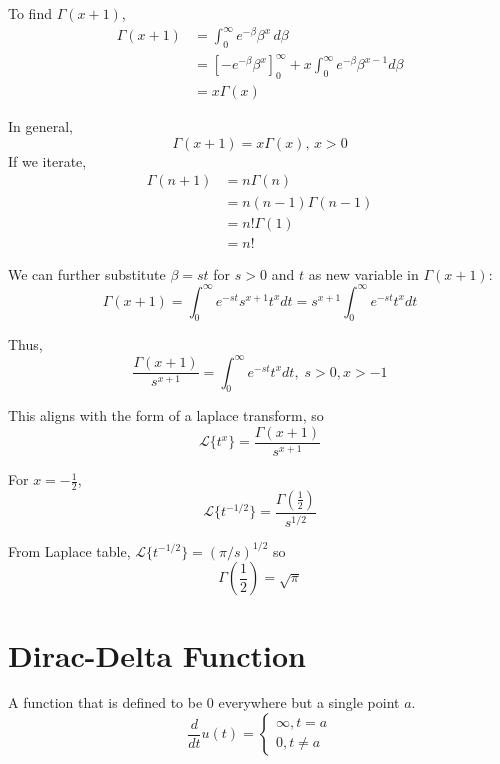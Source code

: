 To find $\Gamma(x+1)$,
\begin{align*}
    \Gamma(x+1)&=\int_0^\infty e^{-\beta}\beta^x\,d\beta\\
    &=\left[-e^{-\beta}\beta^x\right]_0^\infty + x\int_0^\infty e^{-\beta}\beta^{x-1}d\beta\\
    &=x\Gamma(x)
\end{align*}

In general,
\begin{equation}
    \Gamma(x+1)=x\Gamma(x),\,x>0
\end{equation}
If we iterate,
\begin{align*}
    \Gamma(n+1)&=n\Gamma(n)\\
    &=n(n-1)\Gamma(n-1)\\
    &=n!\Gamma(1)\\
    &=n!
\end{align*}

We can further substitute $\beta=st$ for $s>0$ and $t$ as new variable in $\Gamma(x+1)$:
\begin{equation*}
    \Gamma(x+1)=\int_0^\infty e^{-st}s^{x+1}t^xdt=s^{x+1}\int_0^\infty e^{-st}t^xdt
\end{equation*}

Thus,
\begin{equation}
    \frac{\Gamma(x+1)}{s^{x+1}}=\int_0^\infty e^{-st}t^xdt,\;s>0,x>-1
\end{equation}

This aligns with the form of a laplace transform, so
\begin{equation}
    \mathcal{L}\{t^x\}=\frac{\Gamma(x+1)}{s^{x+1}}
\end{equation}

For $x=-\frac{1}{2}$,
\begin{equation*}
    \mathcal{L}\{t^{-1/2}\}=\frac{\Gamma(\frac{1}{2})}{s^{1/2}}
\end{equation*}

From Laplace table, $\mathcal{L}\{t^{-1/2}\}=(\pi/s)^{1/2}$ so
$$ \Gamma\left(\frac{1}{2}\right)=\sqrt{\pi} $$

\section{Dirac-Delta Function}

A function that is defined to be 0 everywhere but a single point $a$.
\begin{equation*}
    \frac{d}{dt}u(t)=\begin{cases}
        \infty,t=a\\
        0,t\neq a
    \end{cases}
\end{equation*}

